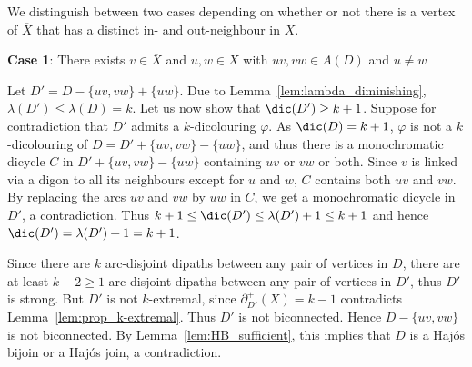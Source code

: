     
        
    We distinguish between two cases depending on whether or not there is a vertex of $\overline{X}$ that has a distinct in- and out-neighbour in $X$.%
    \smallskip 

    \noindent\textbf{Case 1}: There exists $v \in \overline{X}$ and $u,w \in X$ with $uv, vw \in A(D)$ and $u \neq w$
        
    Let $D' = D - \{uv,vw\} + \{uw\}$. Due to Lemma~\ref{lem:lambda_diminishing}, $\lambda(D') \leq \lambda(D) = k$. Let us now show that $\dic(D') \geq k+1$. Suppose for contradiction that  $D'$ admits a $k$-dicolouring $\varphi$. 
    As $\dic(D) = k+1$, $\varphi$ is not a $k$-dicolouring of $D= D' + \{uv, vw\} -\{uw\}$, and thus there is a monochromatic dicycle $C$ in $D' + \{uv, vw\} -\{uw\}$ containing $uv$ or $vw$ or both. 
    Since $v$ is linked via a digon to all its neighbours except for $u$ and $w$, $C$ contains both $uv$ and $vw$. By replacing the arcs $uv$ and $vw$ by $uw$ in $C$, we get a monochromatic dicycle in $D'$, a contradiction. 
    Thus $k+1 \leq \dic(D') \leq \lambda(D') + 1 \leq k+1$ and hence $\dic(D') = \lambda(D') + 1 = k+1$. 

    Since there are $k$ arc-disjoint dipaths between any pair of vertices in $D$, there are at least $k-2 \geq 1$ arc-disjoint dipaths between any pair of vertices in $D'$, thus $D'$ is strong.
    But $D'$ is not $k$-extremal, since $\partial_{D'}^{+}(X) = k-1$ contradicts Lemma~\ref{lem:prop_k-extremal}.  Thus $D'$ is not biconnected. Hence $D - \{uv,vw\}$ is not biconnected. By Lemma~\ref{lem:HB_sufficient}, this implies that $D$ is a Haj\'os bijoin or a Haj\'os join, a contradiction.
     

